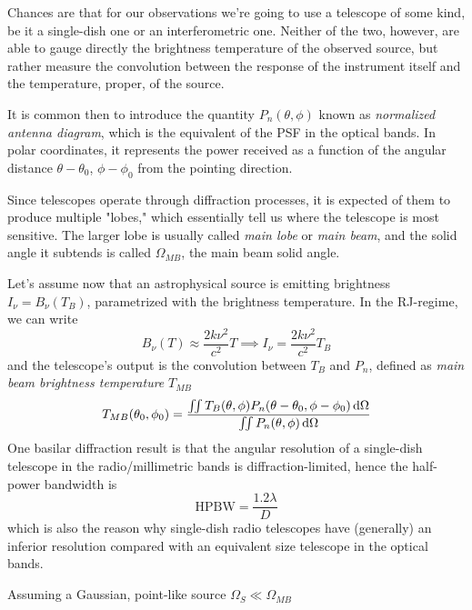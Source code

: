 Chances are that for our observations we're going to use a telescope of some kind, be it a single-dish one or an interferometric one. Neither of the two, however, are able to gauge directly the brightness temperature of the observed source, but rather measure the convolution between the response of the instrument itself and the temperature, proper, of the source.
\par It is common then to introduce the quantity $P_{n}(\theta,\phi)$ known as \emph{normalized antenna diagram}, which is the equivalent of the PSF in the optical bands. In polar coordinates, it represents the power received as a function of the angular distance $\theta-\theta_{0}$, $\phi-\phi_{0}$ from the pointing direction.
\par Since telescopes operate through diffraction processes, it is expected of them to produce multiple "lobes," which essentially tell us where the telescope is most sensitive. The larger lobe is usually called \emph{main lobe} or \emph{main beam}, and the solid angle it subtends is called $\Omega_{MB}$, the main beam solid angle.
\par Let's assume now that an astrophysical source is emitting brightness $I_{\nu} = B_{\nu}(T_{B})$, parametrized with the brightness temperature. In the RJ-regime, we can write
\begin{equation*}
    B_{\nu}(T) \approx \frac{2k\nu^{2}}{c^{2}}T \implies I_{\nu} = \frac{2k\nu^{2}}{c^{2}}T_{B}
\end{equation*}
and the telescope's output is the convolution between $T_{B}$ and $P_{n}$, defined as \emph{main beam brightness temperature} $T_{MB}$ 
\begin{equation}
    T_{MB}(\theta_{0}, \phi_{0}) = \frac{\iint T_{B}(\theta, \phi)P_{n}(\theta-\theta_{0}, \phi-\phi_{0})\,\text{d}\Omega}{\iint P_{n}(\theta,\phi)\,\text{d}\Omega}
    \label{eq:mbtb}
\end{equation}
One basilar diffraction result is that the angular resolution of a single-dish telescope in the radio/millimetric bands is diffraction-limited, hence the half-power bandwidth is 
\begin{equation}
    \text{HPBW} = \frac{1.2\lambda}{D}
\end{equation}
which is also the reason why single-dish radio telescopes have (generally) an inferior resolution compared with an equivalent size telescope in the optical bands.
\par Assuming a Gaussian, point-like source $\Omega_{S} \ll \Omega_{MB}$ 
